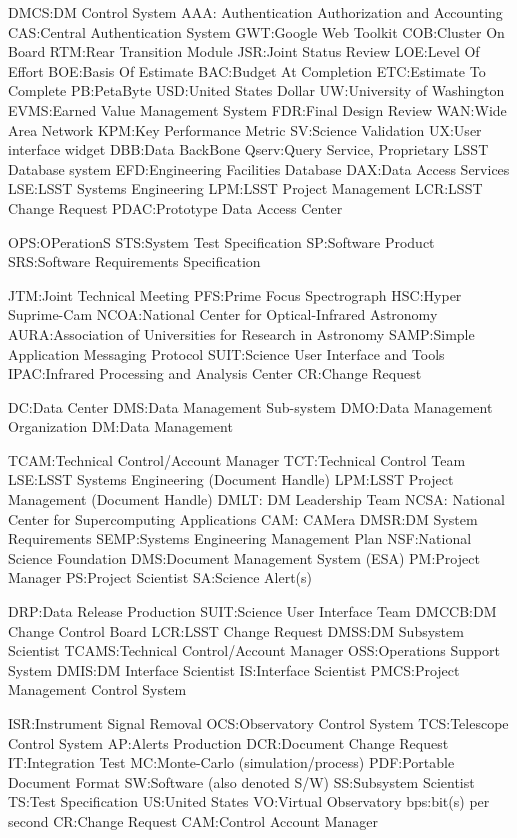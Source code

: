 DMCS:DM Control System
AAA: Authentication Authorization and Accounting
CAS:Central Authentication System
GWT:Google Web Toolkit
COB:Cluster On Board
RTM:Rear Transition Module
JSR:Joint Status Review
LOE:Level Of Effort
BOE:Basis Of Estimate
BAC:Budget At Completion
ETC:Estimate To Complete
PB:PetaByte
USD:United States Dollar
UW:University of Washington
EVMS:Earned Value Management System
FDR:Final Design Review
WAN:Wide Area Network
KPM:Key Performance Metric
SV:Science Validation
UX:User interface widget
DBB:Data BackBone
Qserv:Query Service, Proprietary LSST Database system
EFD:Engineering Facilities Database
DAX:Data Access Services
LSE:LSST Systems Engineering
LPM:LSST Project Management
LCR:LSST Change Request
PDAC:Prototype Data Access Center

OPS:OPerationS
STS:System Test Specification
SP:Software Product
SRS:Software Requirements Specification

JTM:Joint Technical Meeting
PFS:Prime Focus Spectrograph
HSC:Hyper Suprime-Cam
NCOA:National Center for Optical-Infrared Astronomy
AURA:Association of Universities for Research in Astronomy
SAMP:Simple Application Messaging Protocol
SUIT:Science User Interface and Tools
IPAC:Infrared Processing and Analysis Center
CR:Change Request

DC:Data Center
DMS:Data Management Sub-system
DMO:Data Management Organization
DM:Data Management

TCAM:Technical Control/Account Manager
TCT:Technical Control Team
LSE:LSST Systems Engineering (Document Handle)
LPM:LSST Project Management (Document Handle)
DMLT: DM Leadership Team
NCSA: National Center for Supercomputing Applications
CAM: CAMera
DMSR:DM System Requirements
SEMP:Systems Engineering Management Plan
NSF:National Science Foundation
DMS:Document Management System (ESA)
PM:Project Manager
PS:Project Scientist
SA:Science Alert(s)

DRP:Data Release Production
SUIT:Science User Interface Team
DMCCB:DM Change Control Board
LCR:LSST Change Request
DMSS:DM Subsystem Scientist
TCAMS:Technical Control/Account Manager
OSS:Operations Support System
DMIS:DM Interface Scientist
IS:Interface Scientist
PMCS:Project Management Control System

ISR:Instrument Signal Removal
OCS:Observatory Control System
TCS:Telescope Control System
AP:Alerts Production
DCR:Document Change Request
IT:Integration Test
MC:Monte-Carlo (simulation/process)
PDF:Portable Document Format
SW:Software (also denoted S/W)
SS:Subsystem Scientist
TS:Test Specification
US:United States
VO:Virtual Observatory
bps:bit(s) per second
CR:Change Request
CAM:Control Account Manager

